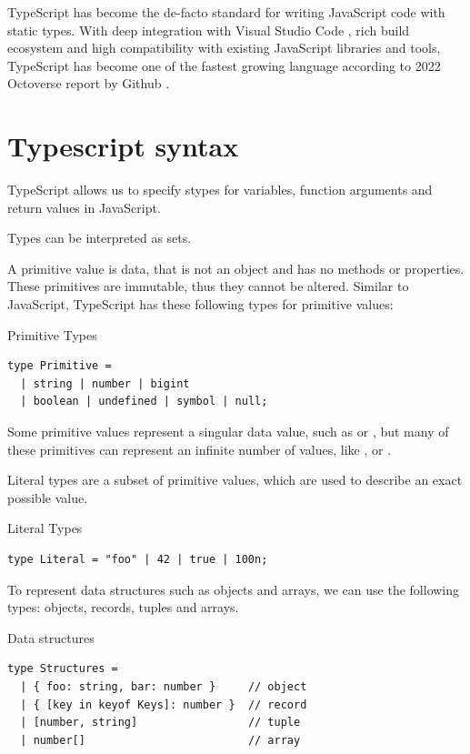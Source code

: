 TypeScript has become the de-facto standard for writing JavaScript code with static types. With deep integration with Visual Studio Code \cite{VisualStudioCode}, rich build ecosystem and high compatibility with existing JavaScript libraries and tools, TypeScript has become one of the fastest growing language according to 2022 Octoverse report by Github \cite{Octoverse2022State}.

\section{Typescript syntax}

TypeScript allows us to specify stypes for variables, function arguments and return values in JavaScript. 

Types can be interpreted as sets.

A primitive value is data, that is not an object and has no methods or properties. These primitives are immutable, thus they cannot be altered. Similar to JavaScript, TypeScript has these following types for primitive values:

\begin{listing}[h]
\caption{Primitive Types}
\begin{verbatim}
type Primitive = 
  | string | number | bigint
  | boolean | undefined | symbol | null;
\end{verbatim}
\end{listing}


Some primitive values represent a singular data value, such as  or , but many of these primitives can represent an infinite number of values, like ,  or .

Literal types are a subset of primitive values, which are used to describe an exact possible value.

\begin{listing}[h]
\caption{Literal Types}
\begin{verbatim}
type Literal = "foo" | 42 | true | 100n;
\end{verbatim}
\end{listing}

To represent data structures such as objects and arrays, we can use the following types: objects, records, tuples and arrays.

\begin{listing}[h]
\caption{Data structures}
\begin{verbatim}
type Structures = 
  | { foo: string, bar: number }     // object
  | { [key in keyof Keys]: number }  // record
  | [number, string]                 // tuple
  | number[]                         // array
\end{verbatim}
\end{listing}

